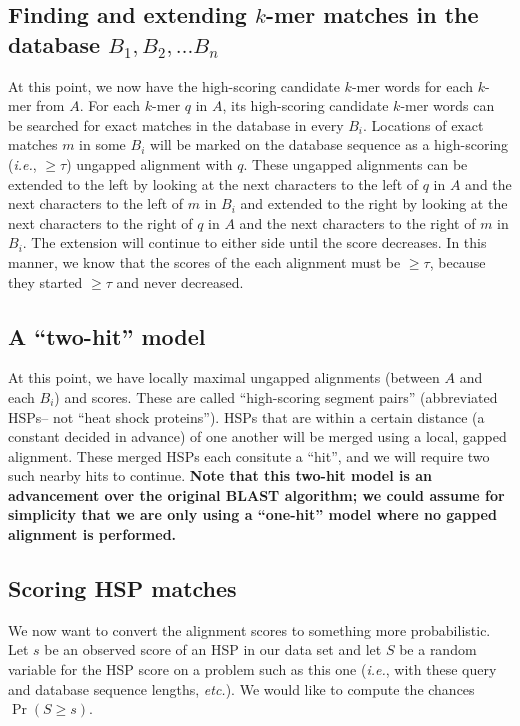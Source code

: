 \documentclass[12pt]{book}
\begin{document}
\subsection{Finding and extending $k$-mer matches in the database $B_1, B_2, \ldots B_n$}
At this point, we now have the high-scoring candidate $k$-mer words
for each $k$-mer from $A$. For each $k$-mer $q$ in $A$, its
high-scoring candidate $k$-mer words can be searched for exact matches
in the database in every $B_i$. Locations of exact matches $m$ in some
$B_i$ will be marked on the database sequence as a high-scoring
(\emph{i.e.}, $\geq \tau$) ungapped alignment with $q$. These ungapped
alignments can be extended to the left by looking at the next
characters to the left of $q$ in $A$ and the next characters to the
left of $m$ in $B_i$ and extended to the right by looking at the next
characters to the right of $q$ in $A$ and the next characters to the
right of $m$ in $B_i$. The extension will continue to either side
until the score decreases. In this manner, we know that the scores of
the each alignment must be $\geq \tau$, because they started $\geq
\tau$ and never decreased.

\subsection{A ``two-hit'' model}
At this point, we have locally maximal ungapped alignments (between
$A$ and each $B_i$) and scores. These are called ``high-scoring
segment pairs'' (abbreviated HSPs-- not ``heat shock proteins''). HSPs
that are within a certain distance (a constant decided in advance) of
one another will be merged using a local, gapped alignment. These
merged HSPs each consitute a ``hit'', and we will require two such
nearby hits to continue. {\bf Note that this two-hit model is an
  advancement over the original BLAST algorithm; we could assume for
  simplicity that we are only using a ``one-hit'' model where no
  gapped alignment is performed.}

\subsection{Scoring HSP matches}
We now want to convert the alignment scores to something more
probabilistic. Let $s$ be an observed score of an HSP in our data set
and let $S$ be a random variable for the HSP score on a problem such
as this one (\emph{i.e.}, with these query and database sequence
lengths, \emph{etc.}). We would like to compute the chances $\Pr(S\geq
s)$.
\end{document}
